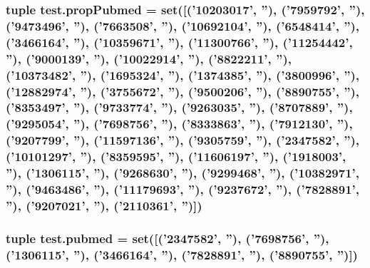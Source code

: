 \label{namespacetest_a6b190968f9c7fc0593c63df10224e21a}
\hypertarget{namespacetest_adc1d0604ecf3fb36f0df45313768ab39}{
\subsubsection[{propPubmed}]{\setlength{\rightskip}{0pt plus 5cm}tuple {\bf test.propPubmed} = set(\mbox{[}('10203017', ''), ('7959792', ''), ('9473496', ''), ('7663508', ''), ('10692104', ''), ('6548414', ''), ('3466164', ''), ('10359671', ''), ('11300766', ''), ('11254442', ''), ('9000139', ''), ('10022914', ''), ('8822211', ''), ('10373482', ''), ('1695324', ''), ('1374385', ''), ('3800996', ''), ('12882974', ''), ('3755672', ''), ('9500206', ''), ('8890755', ''), ('8353497', ''), ('9733774', ''), ('9263035', ''), ('8707889', ''), ('9295054', ''), ('7698756', ''), ('8333863', ''), ('7912130', ''), ('9207799', ''), ('11597136', ''), ('9305759', ''), ('2347582', ''), ('10101297', ''), ('8359595', ''), ('11606197', ''), ('1918003', ''), ('1306115', ''), ('9268630', ''), ('9299468', ''), ('10382971', ''), ('9463486', ''), ('11179693', ''), ('9237672', ''), ('7828891', ''), ('9207021', ''), ('2110361', '')\mbox{]})}}
\label{namespacetest_adc1d0604ecf3fb36f0df45313768ab39}
\hypertarget{namespacetest_aa3b15c95748b55bb3ace649b708b6133}{
\subsubsection[{pubmed}]{\setlength{\rightskip}{0pt plus 5cm}tuple {\bf test.pubmed} = set(\mbox{[}('2347582', ''), ('7698756', ''), ('1306115', ''), ('3466164', ''), ('7828891', ''), ('8890755', '')\mbox{]})}}
\label{namespacetest_aa3b15c95748b55bb3ace649b708b6133}
